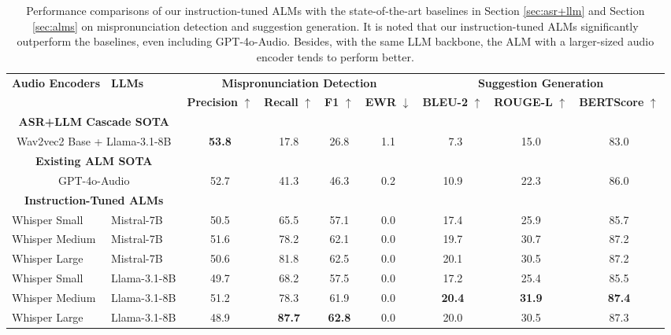 \UseRawInputEncoding
\begin{table}[t]
\centering

\setlength{\tabcolsep}{3pt}
\small
\begin{tabular}{llccccccc} 
\toprule[1pt]
\multirow{2}{*}{\textbf{Audio Encoders}} & \multirow{2}{*}{\textbf{LLMs}}& \multicolumn{4}{c}{\textbf{Mispronunciation Detection}} & \multicolumn{3}{c}{\textbf{Suggestion Generation}} \\ 
\cmidrule(lr){3-6} \cmidrule(lr){7-9}
 & & \textbf{Precision} $\uparrow$ & \textbf{Recall} $\uparrow$ & \textbf{F1} $\uparrow$ & \textbf{EWR} $\downarrow$ & \textbf{BLEU-2} $\uparrow$ & \textbf{ROUGE-L} $\uparrow$ & \textbf{BERTScore} $\uparrow$ \\ 
\midrule[0.5pt]
\multicolumn{2}{c}{\textbf{ASR+LLM Cascade SOTA}} \\
\midrule[0.5pt]
\multicolumn{2}{c}{Wav2vec2 Base + Llama-3.1-8B}       & \textbf{53.8} & 17.8 & 26.8 & 1.1 & \,\,\,7.3  & 15.0 & 83.0 \\
\midrule[0.5pt]
\multicolumn{2}{c}{\textbf{Existing ALM SOTA}} \\
\midrule[0.5pt]
\multicolumn{2}{c}{ GPT-4o-Audio}        & 52.7 & 41.3 & 46.3 & 0.2 & 10.9 & 22.3 & 86.0 \\
\midrule[0.5pt]
\multicolumn{2}{c}{\textbf{Instruction-Tuned ALMs}} \\
\midrule[0.5pt]
Whisper Small     & Mistral-7B    & 50.5 & 65.5 & 57.1 & 0.0   & 17.4 & 25.9 & 85.7 \\
Whisper Medium    & Mistral-7B     & 51.6 & 78.2 & 62.1 & 0.0   & 19.7 & 30.7 & 87.2 \\
Whisper Large     & Mistral-7B    & 50.6 & 81.8 & 62.5 & 0.0   & 20.1 & 30.5 & 87.2 \\
\midrule[0.5pt]
Whisper Small     & Llama-3.1-8B       & 49.7 & 68.2 & 57.5 & 0.0   & 17.2 & 25.4 & 85.5 \\
Whisper Medium    & Llama-3.1-8B       & 51.2 & 78.3 & 61.9 & 0.0   & \textbf{20.4} & \textbf{31.9} & \textbf{87.4} \\
Whisper Large     & Llama-3.1-8B    & 48.9 & \textbf{87.7} & \textbf{62.8} & 0.0   & 20.0 & 30.5 & 87.3 \\
\bottomrule[1pt]
\end{tabular}
\caption{Performance comparisons of our instruction-tuned ALMs with the state-of-the-art baselines in Section \ref{sec:asr+llm} and Section \ref{sec:alms} on mispronunciation detection and suggestion generation. It is noted that our instruction-tuned ALMs significantly outperform the baselines, even including GPT-4o-Audio. Besides, with the same LLM backbone, the ALM with a larger-sized audio encoder tends to perform better.}
\label{tab:all_result}
\vspace{-2mm}
\end{table}

